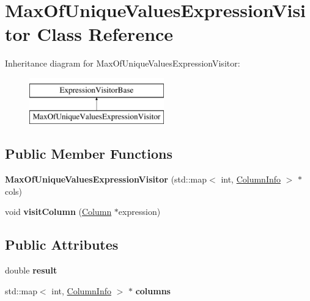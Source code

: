 \hypertarget{class_max_of_unique_values_expression_visitor}{\section{Max\+Of\+Unique\+Values\+Expression\+Visitor Class Reference}
\label{class_max_of_unique_values_expression_visitor}
}
Inheritance diagram for Max\+Of\+Unique\+Values\+Expression\+Visitor\+:\begin{figure}[H]
\begin{center}
\leavevmode
\includegraphics[height=2.000000cm]{class_max_of_unique_values_expression_visitor}
\end{center}
\end{figure}
\subsection*{Public Member Functions}
\begin{DoxyCompactItemize}
\item 
\hypertarget{class_max_of_unique_values_expression_visitor_adf863a6e2406f90466e4f4decab1f4e4}{{\bfseries Max\+Of\+Unique\+Values\+Expression\+Visitor} (std\+::map$<$ int, \hyperlink{class_column_info}{Column\+Info} $>$ $\ast$cols)}\label{class_max_of_unique_values_expression_visitor_adf863a6e2406f90466e4f4decab1f4e4}

\item 
\hypertarget{class_max_of_unique_values_expression_visitor_a1e924d4d6d63474f401adc0c8ba6a455}{void {\bfseries visit\+Column} (\hyperlink{class_column}{Column} $\ast$expression)}\label{class_max_of_unique_values_expression_visitor_a1e924d4d6d63474f401adc0c8ba6a455}

\end{DoxyCompactItemize}
\subsection*{Public Attributes}
\begin{DoxyCompactItemize}
\item 
\hypertarget{class_max_of_unique_values_expression_visitor_a4d1359a778ac14a3709c63bff3a01383}{double {\bfseries result}}\label{class_max_of_unique_values_expression_visitor_a4d1359a778ac14a3709c63bff3a01383}

\item 
\hypertarget{class_max_of_unique_values_expression_visitor_a1f0ca5cd4e5fd0eb513fa64ea21ecae6}{std\+::map$<$ int, \hyperlink{class_column_info}{Column\+Info} $>$ $\ast$ {\bfseries columns}}\label{class_max_of_unique_values_expression_visitor_a1f0ca5cd4e5fd0eb513fa64ea21ecae6}

\end{DoxyCompactItemize}



